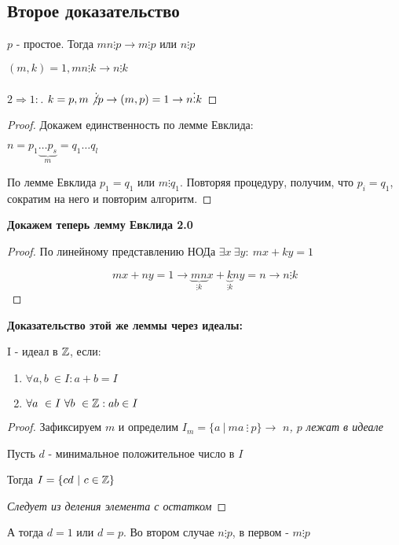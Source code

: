\subsection{Второе доказательство}

\begin{lemma}[Евклида]
  $p$ - простое. Тогда $mn \vdots p \to m \vdots p$ или $n \vdots p$
\end{lemma}

\begin{lemma}[Евклида 2.0]
 $(m, k) = 1, mn \vdots k \to n \vdots k$
\end{lemma}

\begin{proof}[$2 \Longrightarrow 1:$]
  $ k = p, m \not \vdots p \to (m, p) = 1 \to n \vdots k $
\end{proof}

\begin{proof}
  Докажем единственность по лемме Евклида:

  $n = p_1 \underbrace{\dots p_s}_{m} = q_1 \dots q_l$

  По лемме Евклида $p_1 = q_1$ или $m \vdots q_1$. Повторяя процедуру, получим, что $p_i = q_1$, сократим на него и повторим алгоритм.
\end{proof}

\newpage

\textbf{Докажем теперь лемму Евклида 2.0}
\begin{proof}
  По линейному представлению НОДа $\exists x \ \exists y: \ mx + ky = 1$

  $$mx + ny = 1 \to \underbrace{mn}_{\vdots k}x + \underbrace{k}_{\vdots k}ny = n \to n \vdots k$$
\end{proof}

\textbf{Доказательство этой же леммы через идеалы:}

\begin{definition}
  I - идеал в $\mathbb{Z}$, если:
  \begin{enumerate}
    \item $\forall a, b \ \in I: a + b = I$
    \item $\forall a \ \in I \  \forall b \ \in \mathbb{Z}: ab \in I$

  \end{enumerate}
\end{definition}

\begin{proof}
  Зафиксируем $m$ и определим $I_m = \{ a \ | \ ma \ \vdots\  p\} \to$
\textit{$n$, $p$ лежат в идеале} 

  \begin{lemma}
    Пусть $d$ - минимальное положительное число в $I$

    Тогда $I = \{cd \ |\  c \in \mathbb{Z}\}$
  
  \end{lemma}
  \textit{Следует из деления элемента с остатком}
\end{proof}

А тогда $d = 1$ или $d = p$. Во втором случае $n \vdots p$, в первом - $m \vdots p$


